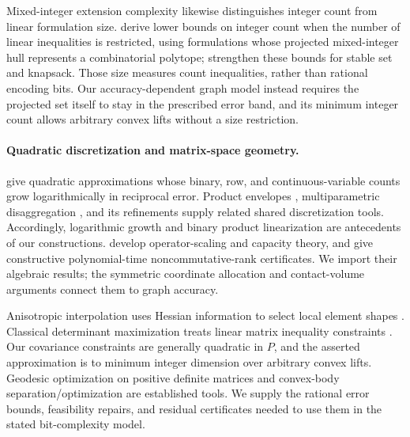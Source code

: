 Mixed-integer extension complexity likewise distinguishes integer count
from linear formulation size. \citet{cevallos2018} derive lower bounds
on integer count when the number of linear inequalities is restricted,
using formulations whose projected mixed-integer hull represents a
combinatorial polytope; \citet{schade2026} strengthen these bounds for
stable set and knapsack. Those size measures count inequalities, rather
than rational encoding bits. Our accuracy-dependent graph model instead
requires the projected set itself to stay in the prescribed error band,
and its minimum integer count allows arbitrary convex lifts without a
size restriction.

\paragraph{Quadratic discretization and matrix-space geometry.}
\citet{beach2022} give quadratic approximations whose binary, row, and
continuous-variable counts grow logarithmically in reciprocal error.
Product envelopes \citep{mccormick1976}, multiparametric disaggregation
\citep{teles2013}, and its refinements \citep{beach2024,beach2024b} supply
related shared discretization tools. Accordingly, logarithmic growth and
binary product linearization are antecedents of our constructions.
\citet{ggow2020} develop operator-scaling and capacity theory, and
\citet{iqs2018} give constructive polynomial-time noncommutative-rank
certificates. We import their algebraic results; the symmetric coordinate
allocation and contact-volume arguments connect them to graph accuracy.

Anisotropic interpolation uses Hessian information to select local element
shapes \citep{cao2007}. Classical determinant maximization treats linear
matrix inequality constraints \citep{vandenberghe1998}. Our covariance
constraints are generally quadratic in $P$, and the asserted approximation
is to minimum integer dimension over arbitrary convex lifts.
Geodesic optimization on positive definite matrices
\citep{sra2013,zhang2016} and convex-body separation/optimization
\citep{gls1981} are established tools. We supply the rational error bounds,
feasibility repairs, and residual certificates needed to use them in the
stated bit-complexity model.

